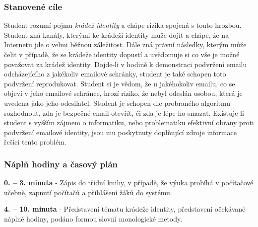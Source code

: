 \documentclass[a4paper, 12pt]{article}
\begin{document}
\subsubsection{Stanovené cíle}
Student rozumí pojmu \textit{krádež identity} a chápe rizika spojená s touto hrozbou. Student zná kanály, kterými ke krádeži identity může dojít a chápe, že na Internetu jde o velmi běžnou záležitost. Dále zná právní následky, kterým může čelit v případě, že se krádeže identity dopustí a uvědomuje si co vše je možné považovat za krádež identity. Dojde-li v hodině k demonstraci podvržení emailu odcházejícího z jakékoliv emailové schránky, student je také schopen toto podvržení reprodukovat. Student si je vědom, že u jakéhokoliv emailu, co se objeví v jeho emailové schránce, hrozí riziko, že nebyl odeslán osobou, která je uvedena jako jeho odesilatel. Student je schopen dle probraného algoritmu rozhodnout, zda je bezpečné email otevřít, či zda je lépe ho smazat. Existuje-li student s vyšším zájmem o informatiku, nebo problematiku efektivní obrany proti podvržení emailové identity, jsou mu poskytnuty doplňující zdroje informace řešící tento problém.

\subsubsection{Náplň hodiny a časový plán}
\indent\textbf{0. -- 3. minuta} - Zápis do třídní knihy, v případě, že výuka probíhá v počítačové učebně, zapnutí počítačů a přihlášení žáků do systému.

\textbf{4. -- 10. minuta} - Představení tématu krádeže identity, představení očekávané náplně hodiny, podáno formou slovní monologické metody.
\end{document}
